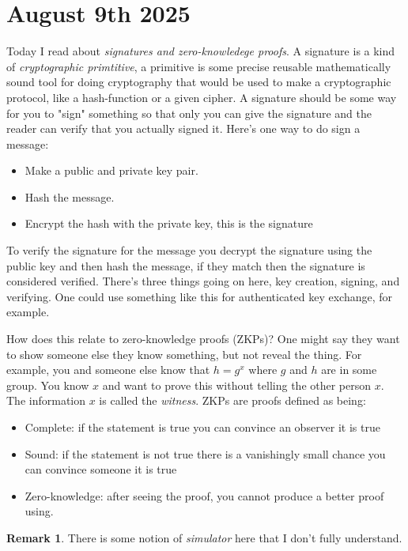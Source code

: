 \documentclass{amsart}
\theoremstyle{definition}
\newtheorem{remark}[theorem]{Remark}
\begin{document}
\section*{August 9th 2025}
Today I read about \textit{signatures and zero-knowledege proofs}. A signature is a kind of \textit{cryptographic primtitive}, a primitive is some precise reusable mathematically sound tool for doing cryptography that would be used to make a cryptographic protocol, like a hash-function or a given cipher. A signature should be some way for you to "sign" something so that only you can give the signature and the reader can verify that you actually signed it. Here's one way to do sign a message: 
\begin{itemize}
    \item Make a public and private key pair.
    \item Hash the message.
    \item Encrypt the hash with the private key, this is the signature
\end{itemize}
To verify the signature for the message you decrypt the signature using the public key and then hash the message, if they match then the signature is considered verified. There's three things going on here, key creation, signing, and verifying. One could use something like this for authenticated key exchange, for example.

How does this relate to zero-knowledge proofs (ZKPs)? One might say they want to show someone else they know something, but not reveal the thing. For example, you and someone else know that $h=g^x$ where $g$ and $h$ are in some group. You know $x$ and want to prove this without telling the other person $x$. The information $x$ is called the \textit{witness}. ZKPs are proofs defined as being:
\begin{itemize}
    \item Complete: if the statement is true you can convince an observer it is true
    \item Sound: if the statement is not true there is a vanishingly small chance you can convince someone it is true
    \item Zero-knowledge: after seeing the proof, you cannot produce a better proof using. 
\end{itemize}

\begin{remark}
    There is some notion of \textit{simulator} here that I don't fully understand.
\end{remark}
\end{document}
